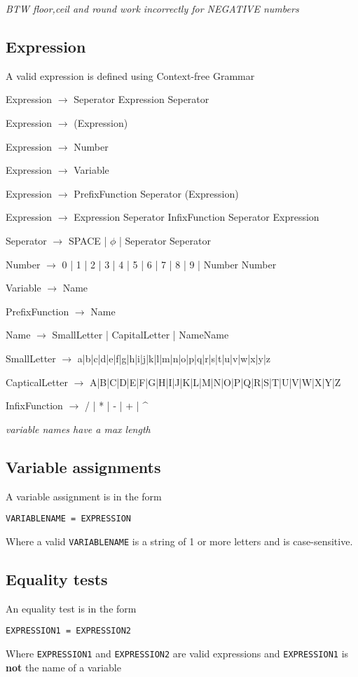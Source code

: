 \documentclass[11pt,a4paper]{article}
\begin{document}
\emph{BTW floor,ceil and round work incorrectly for NEGATIVE numbers}
\subsection{Expression}
A valid expression is defined using Context-free Grammar

Expression \(\rightarrow\) Seperator Expression Seperator

Expression \(\rightarrow\) (Expression)

Expression \(\rightarrow\) Number

Expression \(\rightarrow\) Variable

Expression \(\rightarrow\) PrefixFunction Seperator (Expression)

Expression \(\rightarrow\) Expression Seperator InfixFunction Seperator Expression

Seperator \(\rightarrow\) SPACE | \(\phi\) | Seperator Seperator

Number \(\rightarrow\) 0 | 1 | 2 | 3 | 4 | 5 | 6 | 7 | 8 | 9 | Number Number

Variable \(\rightarrow\) Name

PrefixFunction \(\rightarrow\) Name

Name \(\rightarrow\) SmallLetter | CapitalLetter | NameName

SmallLetter \(\rightarrow\) a|b|c|d|e|f|g|h|i|j|k|l|m|n|o|p|q|r|s|t|u|v|w|x|y|z

CapticalLetter \(\rightarrow\) A|B|C|D|E|F|G|H|I|J|K|L|M|N|O|P|Q|R|S|T|U|V|W|X|Y|Z

InfixFunction \(\rightarrow\) / | * | - | + | \^{}

\emph{variable names have a max length}


\subsection{Variable assignments}
A variable assignment is in the form

\texttt{VARIABLENAME = EXPRESSION}

Where a valid \texttt{VARIABLENAME} is a string of 1 or more letters and
is case-sensitive.
\subsection{Equality tests}
An equality test is in the form

\texttt{EXPRESSION1 = EXPRESSION2}

Where \texttt{EXPRESSION1} and \texttt{EXPRESSION2} are valid expressions and
\texttt{EXPRESSION1} is \textbf{not} the name of a variable
\end{document}
